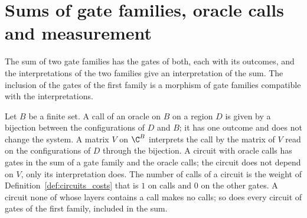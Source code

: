 \section{Sums of gate families, oracle calls and measurement}
\label{sec:circuits_oracles}

\begin{definition}
    \label{def:circuits_gate_sum}
    \leanok
    The sum of two gate families has the gates of both, each with its outcomes, and
    the interpretations of the two families give an interpretation of the sum. The
    inclusion of the gates of the first family is a morphism of gate families
    compatible with the interpretations.
\end{definition}

\begin{definition}
    \label{def:circuits_oracle}
    \leanok
    Let $B$ be a finite set. A call of an oracle on $B$ on a region $D$ is given by a
    bijection between the configurations of $D$ and $B$; it has one outcome and does
    not change the system. A matrix $V$ on $\C^B$ interprets the call by the matrix
    of $V$ read on the configurations of $D$ through the bijection. A circuit with
    oracle calls has gates in the sum of a gate family and the oracle calls; the
    circuit does not depend on $V$, only its interpretation does. The number of
    calls of a circuit is the weight of Definition~\ref{def:circuits_costs} that is
    $1$ on calls and $0$ on the other gates. A circuit none of whose layers contains a
    call makes no calls; so does every circuit of gates of the first family, included
    in the sum.
\end{definition}

